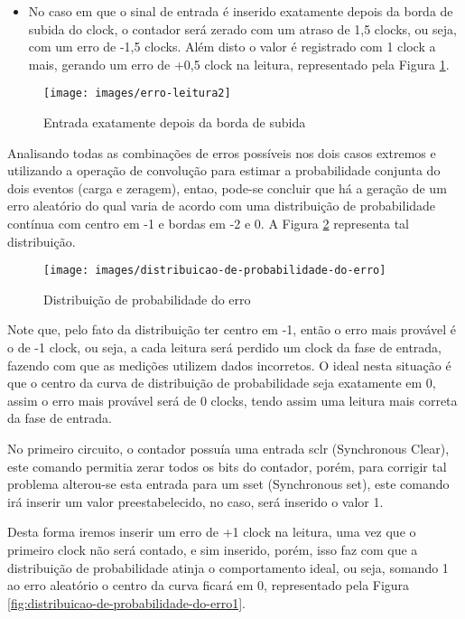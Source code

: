 \clearpage

\begin{itemize}	
	\item No caso em que o sinal de entrada é inserido exatamente depois da borda de subida do clock, o contador será zerado com um atraso de 1,5 clocks, ou seja, com um erro de -1,5 clocks. Além disto o valor é registrado com 1 clock a mais, gerando um erro de +0,5 clock na leitura, representado pela Figura \ref{fig:erro-leitura2}.
\end{itemize}

\begin{figure}[!htp]
	\centering
	\caption{Entrada exatamente depois da borda de subida}
	\texttt{[image: images/erro-leitura2]}
	\label{fig:erro-leitura2}
\end{figure}

Analisando todas as combinações de erros possíveis nos dois casos extremos e utilizando a operação de convolução para estimar a probabilidade conjunta do dois eventos (carga e zeragem), entao, pode-se concluir que há a geração de um erro aleatório do qual varia de acordo com uma distribuição de probabilidade contínua com centro em -1 e bordas em -2 e 0. A Figura \ref{fig:distribuicao-de-probabilidade-do-erro} representa tal distribuição.

\begin{figure}[!htp]
	\centering
	\caption{Distribuição de probabilidade do erro}
	\texttt{[image: images/distribuicao-de-probabilidade-do-erro]}
	\label{fig:distribuicao-de-probabilidade-do-erro}
\end{figure}

Note que, pelo fato da distribuição ter centro em -1, então o erro mais provável é o de -1 clock, ou seja, a cada leitura será perdido um clock da fase de entrada, fazendo com que as medições utilizem dados incorretos. O ideal nesta situação é que o centro da curva de distribuição de probabilidade seja exatamente em 0, assim o erro mais provável será de 0 clocks, tendo assim uma leitura mais correta da fase de entrada.

No primeiro circuito, o contador possuía uma entrada sclr (Synchronous Clear), este comando permitia zerar todos os bits do contador, porém, para corrigir tal problema alterou-se esta entrada para um sset (Synchronous set), este comando irá inserir um valor preestabelecido, no caso, será inserido o valor 1.

Desta forma iremos inserir um erro de +1 clock na leitura, uma vez que o primeiro clock não será contado, e sim inserido, porém, isso faz com que a distribuição de probabilidade atinja o comportamento ideal, ou seja, somando 1 ao erro aleatório o centro da curva ficará em 0, representado pela Figura \ref{fig:distribuicao-de-probabilidade-do-erro1}.

